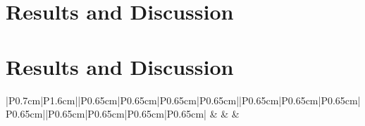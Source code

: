\documentclass{subfiles}
\begin{document}
\section{Results and Discussion}

\section{Results and Discussion}

\begin{table*}[!htbp]
	\renewcommand{\arraystretch}{1.3}
	\caption{File: LDR-FW-FW10\_01-201009821.LAS Execution Time Results of all the data structures tested. Con for Construction time and Pol for Polygonisation time}
	\label{tab:divisiblesNum}
	\centering
	\begin{tabular}{|P{0.7cm}|P{1.6cm}||P{0.65cm}|P{0.65cm}|P{0.65cm}|P{0.65cm}||P{0.65cm}|P{0.65cm}|P{0.65cm}|P{0.65cm}||P{0.65cm}|P{0.65cm}|P{0.65cm}|P{0.65cm}|}	
		\hline\hline
		 &  &  &\multicolumn{4}{c|}{Octree}  \\
		\hline
		

\end{tabular}
\end{table*}
\end{document}
